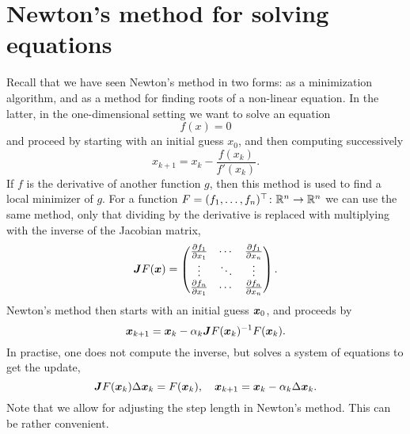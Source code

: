 \section{Newton's method for solving equations}
Recall that we have seen Newton's method in two forms: as a minimization algorithm, and as a method for finding roots of a non-linear equation. In the latter, in the one-dimensional setting we want to solve an equation
\begin{equation*}
  f(x) = 0
\end{equation*}
and proceed by starting with an initial guess $x_0$, and then computing successively
\begin{equation*}
  x_{k+1} = x_k - \frac{f(x_k)}{f'(x_k)}.
\end{equation*}
If $f$ is the derivative of another function $g$, then this method is used to find a local minimizer of $g$. For a function $F=(f_1,\dots,f_n)^{\top}\colon \mathbb{R}^n\to \mathbb{R}^n$ we can use the same method, only that dividing by the derivative is replaced with multiplying with the inverse of the Jacobian matrix,
\begin{equation*}
  \bm{J} F(\bm{x}) = \begin{pmatrix}
    \frac{\partial f_1}{\partial x_1} & \cdots & \frac{\partial f_1}{\partial x_n}\\
    \vdots & \ddots & \vdots \\
    \frac{\partial f_n}{\partial x_1} & \cdots & \frac{\partial f_n}{\partial x_n}
  \end{pmatrix}.
\end{equation*}
Newton's method then starts with an initial guess $\bm{x}_0$, and proceeds by
\begin{equation*}
  \bm{x}_{k+1} =\bm{x}_k - \alpha_k \bm{J}F(\bm{x}_k)^{-1}F(\bm{x}_k).
\end{equation*}
In practise, one does not compute the inverse, but solves a system of equations to get the update,
\begin{equation}\label{eq:update}
  \bm{J}F(\bm{x}_k) \Delta\bm{x}_k = F(\bm{x}_k), \quad \bm{x}_{k+1} = \bm{x}_k-\alpha_k\Delta\bm{x}_k.
\end{equation}
Note that we allow for adjusting the step length in Newton's method. This can be rather convenient.

